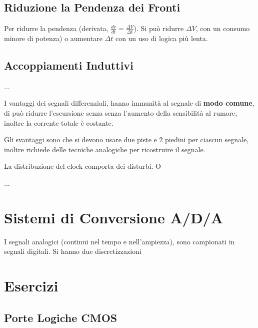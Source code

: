 \documentclass[12pt]{article}
\begin{document}
\subsection{Riduzione la Pendenza dei Fronti}
Per ridurre la pendenza (derivata, $\frac{dv}{dt} = \frac{\Delta V}{\Delta t}$). Si pu\`o ridurre $\Delta V$, con un consumo minore di potenza) o aumentare $\Delta t$ con un uso di logica pi\`u lenta.

\subsection{Accoppiamenti Induttivi}
...

I vantaggi dei segnali differenziali, hanno immunit\`a al segnale di \textbf{modo comune}, di pu\`o ridurre l'escursione senza senza l'aumento della sensibilit\`a al rumore, inoltre la corrente totale \`e costante.

Gli svantaggi sono che si devono usare due piste e 2 piedini per ciascun segnale, inoltre richiede delle tecniche analogiche per ricostruire il segnale.

La distribuzione del clock comporta dei disturbi. O

...




\section{Sistemi di Conversione A/D/A}
I segnali analogici (continui nel tempo e nell'ampiezza), sono campionati in segnali digitali. Si hanno due discretizzazioni 












\newpage
\section{Esercizi}

\subsection{Porte Logiche CMOS}
\end{document}
